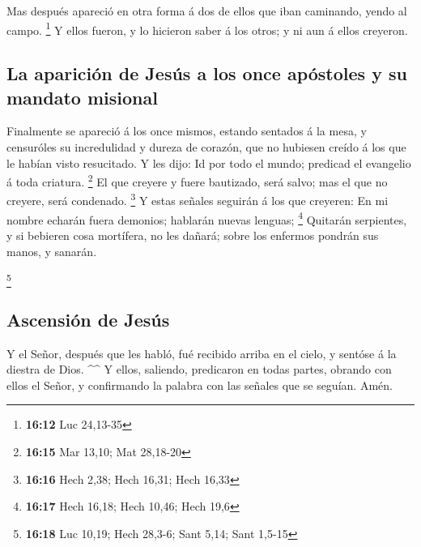  Mas después apareció en otra forma á dos de ellos que iban
caminando, yendo al campo. \footnote{\textbf{16:12} Luc 24,13-35}
 Y ellos fueron, y lo hicieron saber á los otros; y ni aun
á ellos creyeron.

\hypertarget{la-apariciuxf3n-de-jesuxfas-a-los-once-apuxf3stoles-y-su-mandato-misional}{%
\subsection{La aparición de Jesús a los once apóstoles y su mandato
misional}\label{la-apariciuxf3n-de-jesuxfas-a-los-once-apuxf3stoles-y-su-mandato-misional}}

 Finalmente se apareció á los once mismos, estando sentados
á la mesa, y censuróles su incredulidad y dureza de corazón, que no
hubiesen creído á los que le habían visto resucitado.  Y
les dijo: Id por todo el mundo; predicad el evangelio á toda criatura.
\footnote{\textbf{16:15} Mar 13,10; Mat 28,18-20}  El que
creyere y fuere bautizado, será salvo; mas el que no creyere, será
condenado. \footnote{\textbf{16:16} Hech 2,38; Hech 16,31; Hech 16,33}
 Y estas señales seguirán á los que creyeren: En mi nombre
echarán fuera demonios; hablarán nuevas lenguas; \footnote{\textbf{16:17}
  Hech 16,18; Hech 10,46; Hech 19,6}  Quitarán serpientes,
y si bebieren cosa mortífera, no les dañará; sobre los enfermos pondrán
sus manos, y sanarán.

\footnote{\textbf{16:18} Luc 10,19; Hech 28,3-6; Sant 5,14; Sant 1,5-15}

\hypertarget{ascensiuxf3n-de-jesuxfas}{%
\subsection{Ascensión de Jesús}\label{ascensiuxf3n-de-jesuxfas}}

 Y el Señor, después que les habló, fué recibido arriba en
el cielo, y sentóse á la diestra de Dios. \^{}\^{}  Y
ellos, saliendo, predicaron en todas partes, obrando con ellos el Señor,
y confirmando la palabra con las señales que se seguían. Amén.
